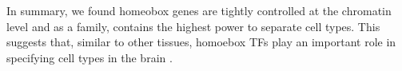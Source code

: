 In summary, we found homeobox genes are tightly controlled at the chromatin level and as a family, contains the highest power to separate cell types. This suggests that, similar to other tissues, homoebox TFs play an important role in specifying cell types in the brain \cite{Kratsios_2017,Zheng_2015,Dasen_2009,Philippidou_2013}.





